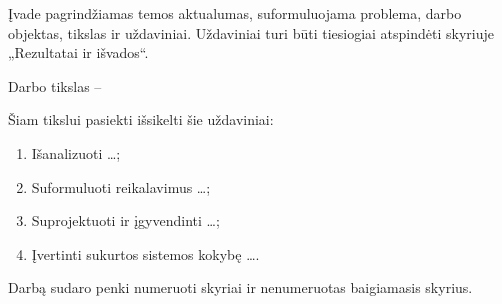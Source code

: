 Įvade pagrindžiamas temos aktualumas, suformuluojama problema, darbo objektas, tikslas ir uždaviniai. Uždaviniai turi būti tiesiogiai atspindėti skyriuje „Rezultatai ir išvados“.

\lipsum[1]

Darbo tikslas -- \lipsum[2][1-2]

Šiam tikslui pasiekti išsikelti šie uždaviniai:

\begin{enumerate}
    \item Išanalizuoti \ldots;
    \item Suformuluoti reikalavimus \ldots;
    \item Suprojektuoti ir įgyvendinti \ldots;
    \item Įvertinti sukurtos sistemos kokybę \ldots.
\end{enumerate}

Darbą sudaro penki numeruoti skyriai ir nenumeruotas baigiamasis skyrius. \lipsum[3][1-3]
